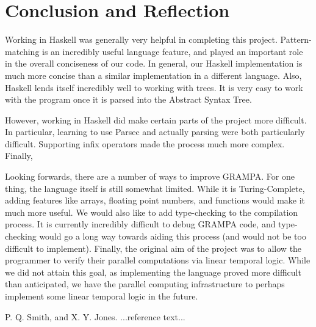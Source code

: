 \documentclass[preprint]{sigplanconf}
\begin{document}
\section{Conclusion and Reflection}

Working in Haskell was generally very helpful in completing this project. Pattern-matching is an incredibly useful language feature, and played an important role in the overall conciseness of our code. In general, our Haskell implementation is much more concise than a similar implementation in a different language. Also, Haskell lends itself incredibly well to working with trees. It is very easy to work with the program once it is parsed into the Abstract Syntax Tree. 

However, working in Haskell did make certain parts of the project more difficult. In particular, learning to use Parsec and actually parsing were both particularly difficult. Supporting infix operators made the process much more complex. Finally, 

Looking forwards, there are a number of ways to improve GRAMPA. For one thing, the language itself is still somewhat limited. While it is Turing-Complete, adding features like arrays, floating point numbers, and functions would make it much more useful. We would also like to add type-checking to the compilation process. It is currently incredibly difficult to debug GRAMPA code, and type-checking would go a long way towards aiding this process (and would not be too difficult to implement). Finally, the original aim of the project was to allow the programmer to verify their parallel computations via linear temporal logic. While we did not attain this goal, as implementing the language proved more difficult than anticipated, we have the parallel computing infrastructure to perhaps implement some linear temporal logic in the future. 







\begin{thebibliography}{}
\softraggedright

P. Q. Smith, and X. Y. Jones. ...reference text...

\end{thebibliography}

\onecolumn
\appendix
\end{document}
